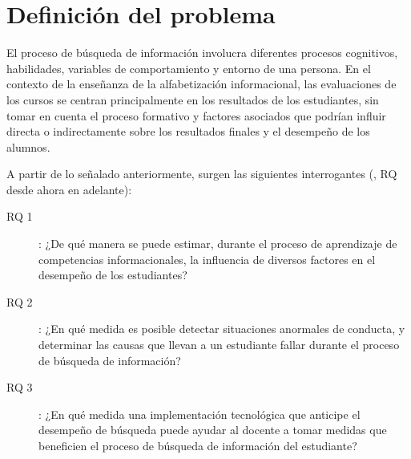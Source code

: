 \section{Definición del problema}
\label{sec:definicion_problema}
El proceso de búsqueda de información involucra diferentes procesos cognitivos, habilidades, variables de comportamiento y entorno de una persona. En el contexto de la enseñanza de la alfabetización informacional, las evaluaciones de los cursos se centran principalmente en los resultados de los estudiantes, sin tomar en cuenta el proceso formativo y factores asociados que podrían influir directa o indirectamente sobre los resultados finales y el desempeño de los alumnos.  

A partir de lo señalado anteriormente, surgen las siguientes interrogantes (, RQ desde ahora en adelante):

\begin{description}
	\item [RQ 1]: ¿De qué manera se puede estimar, durante el proceso de aprendizaje de competencias informacionales, la influencia de diversos factores en el desempeño de los estudiantes?
	\item [RQ 2]: ¿En qué medida es posible detectar situaciones anormales de conducta, y determinar las causas que llevan a un estudiante fallar durante el proceso de búsqueda de información? 
	\item [RQ 3]: ¿En qué medida una implementación tecnológica que anticipe el desempeño de búsqueda puede ayudar al docente a tomar medidas que beneficien el proceso de búsqueda de información del estudiante?
\end{description}
